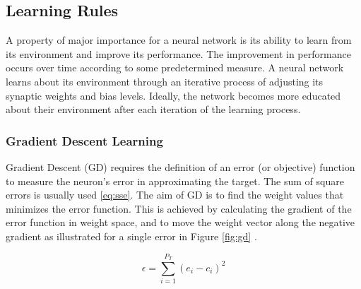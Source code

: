 \subsection{Learning Rules}

A property of major importance for a neural network is its ability to learn from its environment and improve its performance. The improvement in performance occurs over time according to some predetermined measure. A neural network learns about its environment through an iterative process of adjusting its synaptic weights and bias levels. Ideally, the network becomes more educated about their environment after each iteration of the learning process.

\subsubsection{Gradient Descent Learning}

Gradient Descent (GD) requires the definition of an error (or objective) function to measure the neuron's error in approximating the target. The sum of square errors is usually used \ref{eq:sse}. The aim of GD is to find the weight values that minimizes the error function. This is achieved by calculating the gradient of the error function in weight space, and to move the weight vector along the negative gradient as illustrated for a single error in Figure \ref{fig:gd} \cite{engelbrecht2007computational}.

\begin{equation}
\label{eq:sse}
\epsilon = \sum\limits_{i=1}^{P_T}(e_i - c_i)^2
\end{equation}

